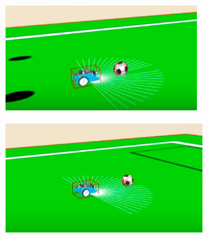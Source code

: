 \begin{figure}[h!]
\begin{subfigure}[b]{0.2\textwidth}
    \includegraphics[width=\textwidth, height=\textwidth]{futbol2.png}
  \end{subfigure}
    \hfill
    \hfill
  \begin{subfigure}[b]{0.2\textwidth}
    \includegraphics[width=\textwidth, height=\textwidth]{futbol3.png}

\end{subfigure}
\end{figure}
